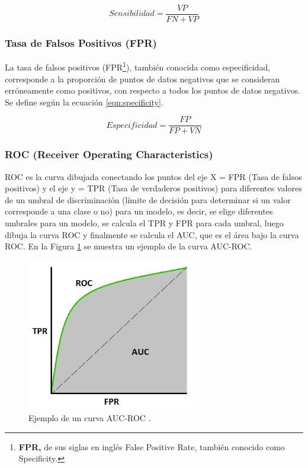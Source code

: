 \begin{equation}
Sensibilidad = \frac{VP}{FN+VP}
\label{eqn:sensibility}
\end{equation}

\subsubsection{Tasa de Falsos Positivos (FPR) }

La tasa de falsos positivos (FPR\footnote{\textbf{FPR, }de sus siglas en ingl\'{e}s False Positive Rate, tambi\'{e}n conocido como Specificity.}), tambi\'{e}n conocida como especificidad, corresponde a la proporción de puntos de datos negativos que se consideran erróneamente como positivos, con respecto a todos los puntos de datos negativos. Se define seg\'{u}n la ecuaci\'{o}n \ref{eqn:specificity}.

\begin{equation}
Especificidad = \frac{FP}{FP+VN}
\label{eqn:specificity}
\end{equation}

\subsubsection{ROC (Receiver Operating Characteristics)}

ROC es la curva dibujada conectando los puntos del eje X = FPR (Tasa de falsos positivos) y el eje y = TPR (Tasa de verdaderos positivos) para diferentes valores de un umbral de discriminaci\'{o}n (l\'{i}mite de decisi\'{o}n para determinar si un valor corresponde a una clase o no) para un modelo, es decir, se elige diferentes umbrales para un modelo, se calcula el TPR y FPR para cada umbral, luego dibuja la curva ROC y finalmente se calcula el AUC, que es el \'{a}rea bajo la curva ROC. En la Figura \ref{fig:auc_roc} se muestra un ejemplo de la curva AUC-ROC.

\begin{figure}[h!]
  \begin{center}	\includegraphics[width=0.65\textwidth, frame]{imagenes/Cap4/auc_roc}
  \caption{Ejemplo de un curva AUC-ROC \protect\cite{Reference62}.}
  \label{fig:auc_roc}
  \end{center}
\end{figure}


